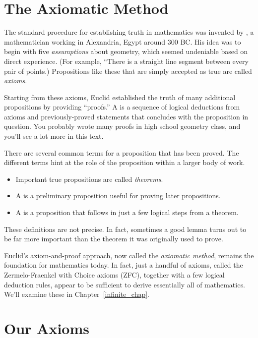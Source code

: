 \section{The Axiomatic Method}\label{axiom_method_sec}

The standard procedure for establishing truth in mathematics was
invented by , a mathematician working in Alexandria, Egypt
around 300 BC.  His idea was to begin with five \textit{assumptions}
about geometry, which seemed undeniable based on direct experience.
(For example, ``There is a straight line segment between every pair of
points.)  Propositions like these that are simply accepted as true are
called%
% 
\emph{axioms}. 

Starting from these axioms, Euclid established the truth of many
additional propositions by providing ``proofs.''  A  is a
sequence of logical deductions from axioms and previously-proved
statements that concludes with the proposition in question.  You
probably wrote many proofs in high school geometry class, and you'll
see a lot more in this text.

There are several common terms for a proposition that has been proved.
The different terms hint at the role of the proposition within a
larger body of work.
%
\begin{itemize}
\item Important true propositions are called \emph{theorems}.%
\item A  is a preliminary proposition useful for proving
later propositions.
\item A  is a proposition that follows
in just a few logical steps from a theorem.  
\end{itemize}
These definitions are not precise.  In fact, sometimes a good lemma
turns out to be far more important than the theorem it was originally
used to prove.

Euclid's axiom-and-proof approach, now called the \emph{axiomatic
  method},%
 remains the foundation for mathematics today.  In fact,
just a handful of axioms, called the Zermelo-Fraenkel with
Choice axioms (ZFC),%
together with a few logical deduction rules, appear to be 
sufficient to derive essentially all of
mathematics.  We'll examine these in Chapter~\ref{infinite_chap}.

\section{Our Axioms}

